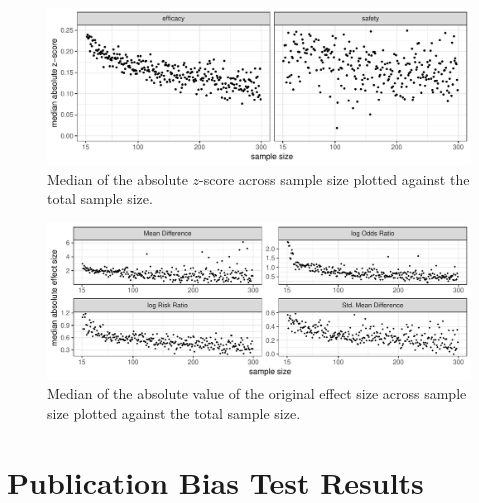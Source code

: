\documentclass[11pt,a4paper,twoside]{book}\usepackage[]{graphicx}\usepackage[]{color}
\newenvironment{knitrout}{}{} %
\begin{document}
\begin{figure}
\begin{knitrout}
\color{fgcolor}

{\centering \includegraphics[width=\textwidth-3cm]{figure/ch03_figunnamed-chunk-11-1} 

}



\end{knitrout}
\caption{Median of the absolute $z$-score across sample size plotted against the total sample size.}
\label{z.samplesize}
\end{figure}

\begin{figure}
\begin{knitrout}
\color{fgcolor}

{\centering \includegraphics[width=\textwidth-3cm]{figure/ch03_figunnamed-chunk-12-1} 

}



\end{knitrout}
\caption{Median of the absolute value of the original effect size across sample size plotted against the total sample size.}
\label{effect.samplesize.separated}
\end{figure}



\section{Publication Bias Test Results} \label{sec:publication.bias.tests}
\end{document}
